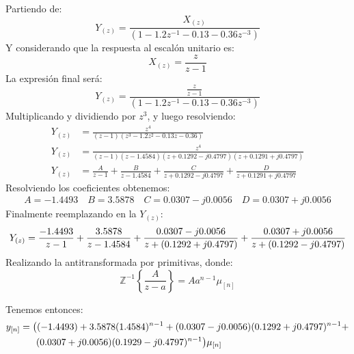 \documentclass[a4paper,12pt]{report}
\begin{document}
\begin{enumerate}[label=\alph*), left=0pt]
    Partiendo de:
    $$Y_{(z)}  = \frac{X_{(z)}}{(1 - 1.2 z^{-1} - 0.13 - 0.36 z^{-3})}$$
    Y considerando que la respuesta al escalón unitario es:
    $$X_{(z)}  = \frac{z}{z-1}$$
    La expresión final será:
    $$Y_{(z)}  = \frac{\frac{z}{z-1}}{(1 - 1.2 z^{-1} - 0.13 - 0.36 z^{-3})}$$
    Multiplicando y dividiendo por $z^3$, y luego resolviendo:
    \begin{align*}
      Y_{(z)} &= \frac{z^4}{(z - 1)(z^3 - 1.2 z^2 - 0.13 z - 0.36)}\\
      Y_{(z)} &= \frac{z^4}{(z - 1)(z - 1.4584)(z + 0.1292 - j0.4797)(z + 0.1291 + j0.4797)}\\
      Y_{(z)} &= \frac{A}{z - 1} + \frac{B}{z - 1.4584} + \frac{C}{z + 0.1292 - j0.4797} + \frac{D}{z + 0.1291 + j0.4797}
    \end{align*}
    Resolviendo los coeficientes obtenemos:
    \begin{align*}
      A = -1.4493 \quad
      B = 3.5878 \quad
      C = 0.0307 - j0.0056 \quad
      D = 0.0307 + j0.0056
    \end{align*}
    Finalmente reemplazando en la $Y_{(z)}$:
    \begin{equation*}
      Y_{(z)} = \frac{-1.4493}{z - 1} + \frac{3.5878}{z - 1.4584} + \frac{0.0307 - j0.0056}{z + (0.1292 + j0.4797)} +
        \frac{0.0307 + j0.0056}{z + (0.1292 - j0.4797)}\\
    \end{equation*}
    Realizando la antitransformada por primitivas, donde:
    \begin{equation}
      \mathbb{Z}^{-1} \left\{ \frac{A}{z-a}\right\} = A a^{n-1} \mu_{[n]}
    \end{equation}

    Tenemos entonces:
    \begin{align*}
      y_{[n]} &= \big((-1.4493) + 3.5878 (1.4584)^{n-1} + (0.0307 - j0.0056)(0.1292 + j0.4797)^{n-1} +\\
              &\hspace{6mm}(0.0307 + j0.0056)(0.1929 - j0.4797)^{n-1} \big) \mu_{[n]}
    \end{align*}



\end{enumerate}
\end{document}
